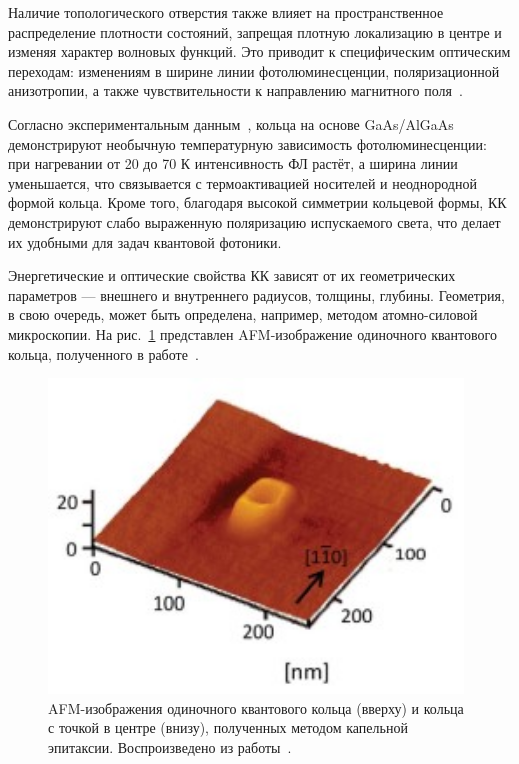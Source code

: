 \documentclass[14pt,oneside]{extarticle}
\begin{document}
Наличие топологического отверстия также влияет на пространственное распределение плотности состояний, запрещая плотную локализацию в центре и изменяя характер волновых функций. Это приводит к специфическим оптическим переходам: изменениям в ширине линии фотолюминесценции, поляризационной анизотропии, а также чувствительности к направлению магнитного поля~\cite{Beo2020}.

Согласно экспериментальным данным~\cite{sibirmovskiy2018}, кольца на основе GaAs/AlGaAs демонстрируют необычную температурную зависимость фотолюминесценции: при нагревании от 20 до 70 К интенсивность ФЛ растёт, а ширина линии уменьшается, что связывается с термоактивацией носителей и неоднородной формой кольца. Кроме того, благодаря высокой симметрии кольцевой формы, КК демонстрируют слабо выраженную поляризацию испускаемого света, что делает их удобными для задач квантовой фотоники.

Энергетические и оптические свойства КК зависят от их геометрических параметров — внешнего и внутреннего радиусов, толщины, глубины. Геометрия, в свою очередь, может быть определена, например, методом атомно-силовой микроскопии. На рис.~\ref{fig:elborg2} представлен AFM-изображение одиночного квантового кольца, полученного в работе~\cite{elborg2017}.

\begin{figure}[H]
    \begin{center}
        \includegraphics[width=11cm]{images/elborg_fig2.png}
        \caption{\label{fig:elborg2}
            AFM-изображения одиночного квантового кольца (вверху) и кольца с точкой в центре (внизу), полученных методом капельной эпитаксии. Воспроизведено из работы~\cite{elborg2017}.}
    \end{center}
\end{figure}
\end{document}
